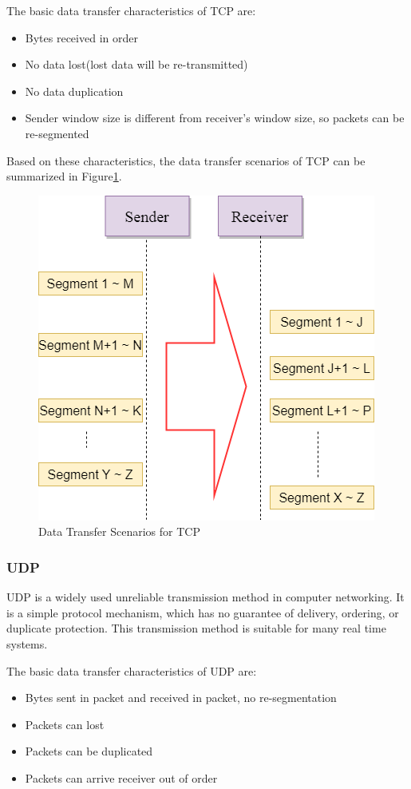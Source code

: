 The basic data transfer characteristics of TCP are:
\begin{itemize}
  \item Bytes received in order
  \item No data lost(lost data will be re-transmitted)
  \item No data duplication
  \item Sender window size is different from receiver's window size, so packets can be re-segmented
\end{itemize}

Based on these characteristics,  the data transfer scenarios of TCP can be summarized in Figure\ref{tcp}.
\begin{figure}[H]
\centerline{\includegraphics[scale=0.48]{Figures/tcp}}
 \caption{Data Transfer Scenarios for TCP}
\label{tcp}
\end{figure}

\subsubsection{UDP}
UDP is a widely used unreliable transmission method in computer networking. It is a simple protocol mechanism, which has no guarantee of delivery, ordering, or duplicate protection. This transmission method is suitable for many real time systems. 

The basic data transfer characteristics of UDP are:
\begin{itemize}
  \item Bytes sent in packet and received in packet, no re-segmentation
  \item Packets can lost
  \item Packets can be duplicated
  \item Packets can arrive receiver out of order
\end{itemize}


